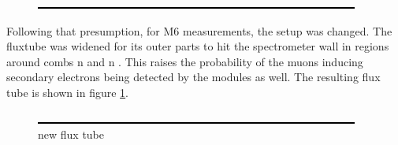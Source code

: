   \begin{figure}
  	\includegraphics[width = 0.9 \textwidth]{graphics/dummy.eps}
  \end{figure}
  
  Following that presumption, for M6 measurements, the setup was changed. The fluxtube was widened for its outer parts to hit the spectrometer wall in regions around combs n and n . This raises the probability of the muons inducing secondary electrons being detected by the modules as well. The resulting flux tube is shown in figure \ref{fig:newFluxTube}. 
  \begin{figure}
	\label{fig:newFluxTube}
	\caption{new flux tube}
  	\includegraphics[width = 0.9 \textwidth]{graphics/dummy.eps}
  \end{figure}
  
